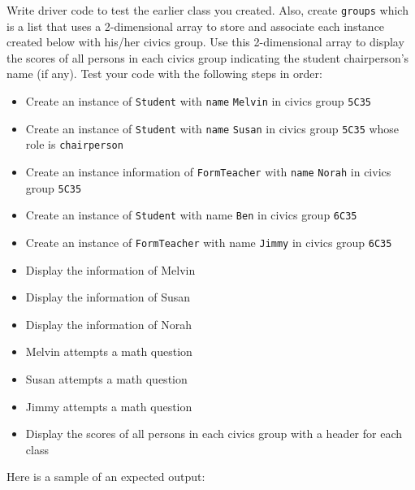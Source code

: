 Write driver code to test the earlier class you created. Also, create
\texttt{groups} which is a list that uses a 2-dimensional array to
store and associate each instance created below with his/her civics
group. Use this 2-dimensional array to display the scores of all persons
in each civics group indicating the student chairperson\textquoteright s
name (if any). Test your code with the following steps in order: 
\begin{itemize}
\item Create an instance of \texttt{Student} with \texttt{name} \textquotedbl\texttt{Melvin}\textquotedbl{}
in civics group \texttt{5C35} 
\item Create an instance of \texttt{Student} with \texttt{name} \textquotedbl\texttt{Susan}\textquotedbl{}
in civics group \texttt{5C35} whose role is \textquotedbl\texttt{chairperson}\textquotedbl{} 
\item Create an instance information of \texttt{FormTeacher} with \texttt{name}
\textquotedbl\texttt{Norah}\textquotedbl{} in civics group \texttt{5C35} 
\item Create an instance of \texttt{Student} with name \textquotedbl\texttt{Ben}\textquotedbl{}
in civics group \texttt{6C35} 
\item Create an instance of \texttt{FormTeacher} with name \textquotedbl\texttt{Jimmy}\textquotedbl{}
in civics group \texttt{6C35} 
\item Display the information of Melvin 
\item Display the information of Susan 
\item Display the information of Norah 
\item Melvin attempts a math question 
\item Susan attempts a math question 
\item Jimmy attempts a math question 
\item Display the scores of all persons in each civics group with a header
for each class 
\end{itemize}
Here is a sample of an expected output: 

